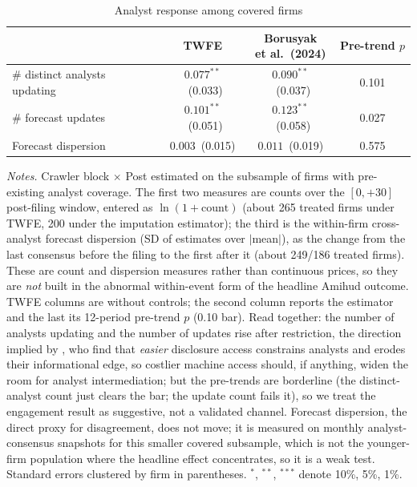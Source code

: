 \begin{table}[t]
\centering
\begin{threeparttable}
\caption{Analyst response among covered firms}
\label{tab:analyst}
\small
\setlength{\tabcolsep}{8pt}
\begin{tabular}{@{}lccc@{}}
\toprule
 & TWFE & \makecell{Borusyak\\et al.\ (2024)} & \makecell{Pre-trend\\$p$} \\
\midrule
\# distinct analysts updating & $0.077^{**}$\ (0.033) & $0.090^{**}$\ (0.037) & 0.101 \\
\# forecast updates           & $0.101^{**}$\ (0.051) & $0.123^{**}$\ (0.058) & 0.027 \\
Forecast dispersion           & $0.003$\ (0.015)      & $0.011$\ (0.019)      & 0.575 \\
\bottomrule
\end{tabular}
\begin{tablenotes}\footnotesize
\item \textit{Notes.} Crawler block $\times$ Post estimated on the subsample of firms with pre-existing analyst coverage. The first two measures are counts over the $[0,+30]$ post-filing window, entered as $\ln(1+\text{count})$ (about 265 treated firms under TWFE, 200 under the imputation estimator); the third is the within-firm cross-analyst forecast dispersion (SD of estimates over $|$mean$|$), as the change from the last consensus before the filing to the first after it (about 249/186 treated firms). These are count and dispersion measures rather than continuous prices, so they are \emph{not} built in the abnormal within-event form of the headline Amihud outcome. TWFE columns are without controls; the second column reports the \citet{BorusyakJaravelSpiess2024} estimator and the last its 12-period pre-trend $p$ (0.10 bar). Read together: the number of analysts updating and the number of updates rise after restriction, the direction implied by \citet{ChangLjungqvistTseng2023}, who find that \emph{easier} disclosure access constrains analysts and erodes their informational edge, so costlier machine access should, if anything, widen the room for analyst intermediation; but the pre-trends are borderline (the distinct-analyst count just clears the bar; the update count fails it), so we treat the engagement result as suggestive, not a validated channel. Forecast dispersion, the direct proxy for disagreement, does not move; it is measured on monthly analyst-consensus snapshots for this smaller covered subsample, which is not the younger-firm population where the headline effect concentrates, so it is a weak test. Standard errors clustered by firm in parentheses. $^{*}$, $^{**}$, $^{***}$ denote 10\%, 5\%, 1\%.
\end{tablenotes}
\end{threeparttable}
\end{table}
